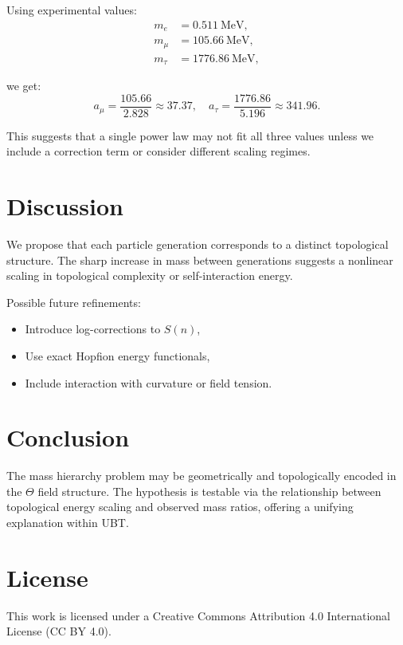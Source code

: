 \documentclass[12pt]{article}
\begin{document}
Using experimental values:
\begin{align*}
m_e &= 0.511~\text{MeV}, \\
m_\mu &= 105.66~\text{MeV}, \\
m_\tau &= 1776.86~\text{MeV},
\end{align*}

we get:
\[
a_\mu = \frac{105.66}{2.828} \approx 37.37,\quad
a_\tau = \frac{1776.86}{5.196} \approx 341.96.
\]

This suggests that a single power law may not fit all three values unless we include a correction term or consider different scaling regimes.

\section{Discussion}

We propose that each particle generation corresponds to a distinct topological structure. The sharp increase in mass between generations suggests a nonlinear scaling in topological complexity or self-interaction energy.

Possible future refinements:
\begin{itemize}
    \item Introduce log-corrections to $S(n)$,
    \item Use exact Hopfion energy functionals,
    \item Include interaction with curvature or field tension.
\end{itemize}

\section{Conclusion}

The mass hierarchy problem may be geometrically and topologically encoded in the $\Theta$ field structure. The hypothesis is testable via the relationship between topological energy scaling and observed mass ratios, offering a unifying explanation within UBT.


\section*{License}
This work is licensed under a Creative Commons Attribution 4.0 International License (CC BY 4.0).
\end{document}
